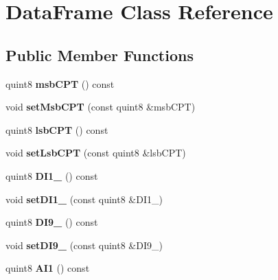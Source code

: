 \hypertarget{class_data_frame}{}\section{Data\+Frame Class Reference}
\label{class_data_frame}
\subsection*{Public Member Functions}
\begin{DoxyCompactItemize}
\item 
\mbox{\label{class_data_frame_a332852f8102a28a06d8ffaeeec54c21c}} 
quint8 {\bfseries msb\+C\+PT} () const
\item 
\mbox{\label{class_data_frame_a5aa1596044f580fbe7d9e86a89ea68de}} 
void {\bfseries set\+Msb\+C\+PT} (const quint8 \&msb\+C\+PT)
\item 
\mbox{\label{class_data_frame_a6d798f4059cc25af9e2538481dcf0a23}} 
quint8 {\bfseries lsb\+C\+PT} () const
\item 
\mbox{\label{class_data_frame_add959a38e6289222dfa41d513ec07010}} 
void {\bfseries set\+Lsb\+C\+PT} (const quint8 \&lsb\+C\+PT)
\item 
\mbox{\label{class_data_frame_aa2b800173847f3fad783f87a72aeea63}} 
quint8 {\bfseries D\+I1\+\_} () const
\item 
\mbox{\label{class_data_frame_a65744d28b325e675efc59934c3b2aeab}} 
void {\bfseries set\+D\+I1\+\_} (const quint8 \&D\+I1\+\_)
\item 
\mbox{\label{class_data_frame_ad5982f4f20155be6c22a73409e3ad66f}} 
quint8 {\bfseries D\+I9\+\_} () const
\item 
\mbox{\label{class_data_frame_a390876c7a975adfefa0d3c9d7fa19a7f}} 
void {\bfseries set\+D\+I9\+\_} (const quint8 \&D\+I9\+\_)
\item 
\mbox{\label{class_data_frame_ac7267a019c34e47c775099aef9861b96}} 
quint8 {\bfseries A\+I1} () const

\end{DoxyCompactItemize}
